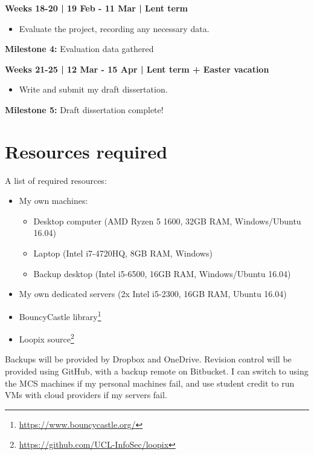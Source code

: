\documentclass[12pt,a4paper,twoside]{article}
\begin{document}
	\textbf{Weeks 18-20 | 19 Feb - 11 Mar | Lent term}
	
	\begin{itemize}
		\item Evaluate the project, recording any necessary data.
	\end{itemize}
	
	\textbf{Milestone 4:} Evaluation data gathered
	
	\textbf{Weeks 21-25 | 12 Mar - 15 Apr | Lent term + Easter vacation}
	
	\begin{itemize}
		\item Write and submit my draft dissertation.
	\end{itemize}
	
	\textbf{Milestone 5:} Draft dissertation complete!
	
	\section*{Resources required}
	
	A list of required resources:
	
	\begin{itemize}
		\item My own machines:
		\begin{itemize}
			\item Desktop computer (AMD Ryzen 5 1600, 32GB RAM, Windows/Ubuntu 16.04)
			\item Laptop (Intel i7-4720HQ, 8GB RAM, Windows)
			\item Backup desktop (Intel i5-6500, 16GB RAM, Windows/Ubuntu 16.04)
		\end{itemize}
		\item My own dedicated servers (2x Intel i5-2300, 16GB RAM, Ubuntu 16.04)
		\item BouncyCastle library\footnote{\url{https://www.bouncycastle.org/}}
		\item Loopix source\footnote{\url{https://github.com/UCL-InfoSec/loopix}}
	\end{itemize}
	
	Backups will be provided by Dropbox and OneDrive. Revision control will be provided using GitHub, with a backup remote on Bitbucket. I can switch to using the MCS machines if my personal machines fail, and use student credit to run VMs with cloud providers if my servers fail.
	
%	
%	
	
\end{document}
